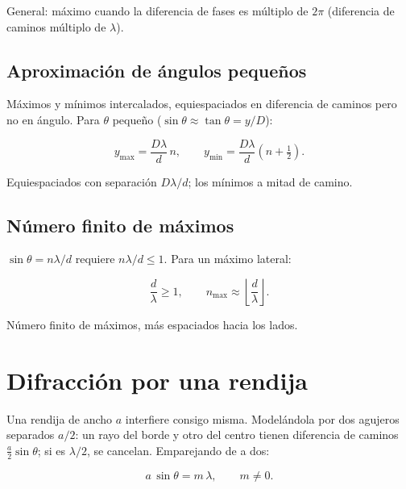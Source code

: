 \documentclass[12pt,a4paper]{article}
\begin{document}
General: máximo cuando la diferencia de fases es múltiplo de $2\pi$ (diferencia
de caminos múltiplo de $\lambda$).

\subsection{Aproximación de ángulos pequeños}

Máximos y mínimos intercalados, equiespaciados en diferencia de caminos pero no
en ángulo. Para $\theta$ pequeño ($\sin\theta \approx \tan\theta = y/D$):

\begin{keybox}
  \[
  \boxed{y_{\max} = \frac{D\lambda}{d}\,n}, \qquad
  y_{\min} = \frac{D\lambda}{d}\left(n+\tfrac12\right).
  \]
\end{keybox}

Equiespaciados con separación $D\lambda/d$; los mínimos a mitad de camino.



\subsection{Número finito de máximos}

$\sin\theta = n\lambda/d$ requiere $n\lambda/d \le 1$. Para un máximo lateral:

\begin{keybox}
  \[
  \boxed{\frac{d}{\lambda} \ge 1}, \qquad n_{\max} \approx \left\lfloor
  \frac{d}{\lambda}\right\rfloor.
  \]
\end{keybox}

Número finito de máximos, más espaciados hacia los lados.



\section{Difracción por una rendija}

Una rendija de ancho $a$ interfiere consigo misma. Modelándola por dos agujeros
separados $a/2$: un rayo del borde y otro del centro tienen diferencia de
caminos $\tfrac{a}{2}\sin\theta$; si es $\lambda/2$, se cancelan. Emparejando de
a dos:

\begin{keybox}
  \[
  \boxed{a\,\sin\theta = m\,\lambda}, \qquad m \neq 0.
  \]
\end{keybox}
\end{document}
